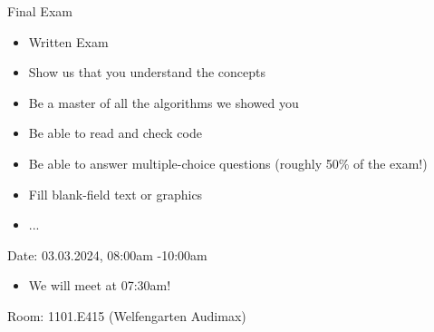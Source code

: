 \documentclass[aspectratio=169,handout]{../latex_main/tntbeamer}  %
\begin{document}
\begin{frame}[c]{Final Exam}

\begin{itemize}
  \item Written Exam
  \item Show us that you understand the concepts
  \item Be a master of all the algorithms we showed you
  \item Be able to read and check code
  \item Be able to answer multiple-choice questions (roughly 50\% of the exam!)
  \item Fill blank-field text or graphics
  \item ...
\end{itemize}

\vspace{1em}
\alert{Date:} 03.03.2024, 08:00am -10:00am\\
    \begin{itemize}
        \item We will meet at 07:30am!
    \end{itemize}
\alert{Room:} 1101.E415 (Welfengarten Audimax)

\end{frame}
\end{document}
